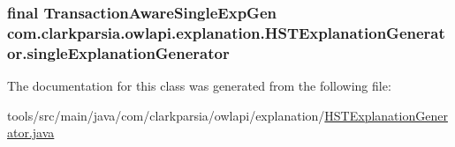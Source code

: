 \hypertarget{classcom_1_1clarkparsia_1_1owlapi_1_1explanation_1_1_h_s_t_explanation_generator_a85e3661c6342eb22238b33589cbc1abb}{
\subsubsection[{single\-Explanation\-Generator}]{\setlength{\rightskip}{0pt plus 5cm}final {\bf Transaction\-Aware\-Single\-Exp\-Gen} com.\-clarkparsia.\-owlapi.\-explanation.\-H\-S\-T\-Explanation\-Generator.\-single\-Explanation\-Generator\hspace{0.3cm}{\ttfamily [private]}}}\label{classcom_1_1clarkparsia_1_1owlapi_1_1explanation_1_1_h_s_t_explanation_generator_a85e3661c6342eb22238b33589cbc1abb}


The documentation for this class was generated from the following file\-:\begin{DoxyCompactItemize}
\item 
tools/src/main/java/com/clarkparsia/owlapi/explanation/\hyperlink{_h_s_t_explanation_generator_8java}{H\-S\-T\-Explanation\-Generator.\-java}\end{DoxyCompactItemize}
